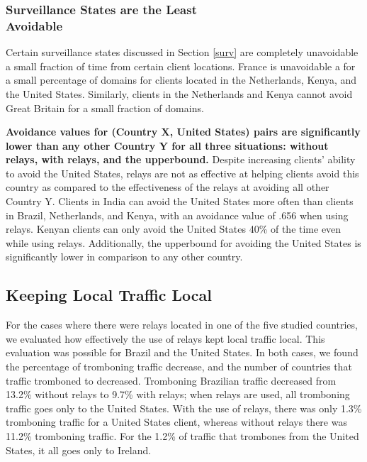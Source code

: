 \subsubsection{Surveillance States are the Least \\Avoidable}
Certain surveillance states discussed in Section \ref{surv} are completely unavoidable a small fraction of time from certain client locations.  France is unavoidable a for a small percentage of domains for clients located in the Netherlands, Kenya, and the United States.  Similarly, clients in the Netherlands and Kenya cannot avoid Great Britain for a small fraction of domains.  

{\bf Avoidance values for (Country X, United States) pairs are significantly lower than any other Country Y for all three situations: without relays, with relays, and the upperbound.}   Despite increasing clients' ability to avoid the United States, relays are not as effective at helping clients avoid this country as compared to the effectiveness of the relays at avoiding all other Country Y.  Clients in India can avoid the United States more often than clients in Brazil, Netherlands, and Kenya, with an avoidance value of .656 when using relays.  Kenyan clients can only avoid the United States 40\% of the time even while using relays.  Additionally, the upperbound for avoiding the United States is significantly lower in comparison to any other country.  

\subsection{Keeping Local Traffic Local}
For the cases where there were relays located in one of the five studied countries, we evaluated how effectively the use of relays kept local traffic local.  This evaluation was possible for Brazil and the United States.  In both cases, we found the percentage of tromboning traffic decrease, and the number of countries that traffic tromboned to decreased.  Tromboning Brazilian traffic decreased from 13.2\% without relays to 9.7\% with relays; when relays are used, all tromboning traffic goes only to the United States.  With the use of relays, there was only 1.3\% tromboning traffic for a United States client, whereas without relays there was 11.2\% tromboning traffic.  For the 1.2\% of traffic that trombones from the United States, it all goes only to Ireland.
